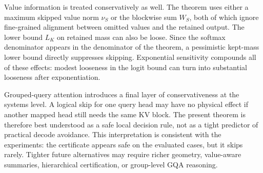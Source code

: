 Value information is treated conservatively as well. The theorem uses either a maximum skipped value norm \(\nu_S\) or the blockwise sum \(W_S\), both of which ignore fine-grained alignment between omitted values and the retained output. The lower bound \(L_K\) on retained mass can also be loose. Since the softmax denominator appears in the denominator of the theorem, a pessimistic kept-mass lower bound directly suppresses skipping. Exponential sensitivity compounds all of these effects: modest looseness in the logit bound can turn into substantial looseness after exponentiation.

Grouped-query attention introduces a final layer of conservativeness at the systems level. A logical skip for one query head may have no physical effect if another mapped head still needs the same KV block. The present theorem is therefore best understood as a safe local decision rule, not as a tight predictor of practical decode avoidance. This interpretation is consistent with the experiments: the certificate appears safe on the evaluated cases, but it skips rarely. Tighter future alternatives may require richer geometry, value-aware summaries, hierarchical certification, or group-level GQA reasoning.
